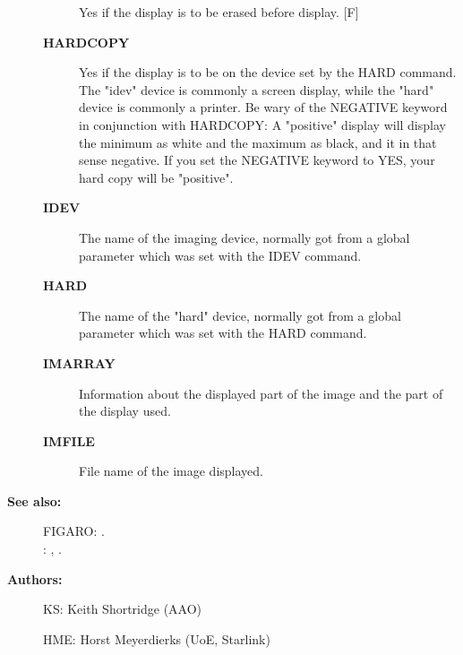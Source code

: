 \begin{description}
\begin{description}
 Yes if the display is to be erased before display. [F]
\item [{\bf HARDCOPY}]
 Yes if the display is to be on the device set by the HARD
 command. The "idev" device is commonly a screen display, while
 the "hard" device is commonly a printer.   Be wary of the
 NEGATIVE keyword in conjunction with HARDCOPY:  A "positive"
 display will display the minimum as white and the maximum as
 black, and it in that sense negative. If you set the NEGATIVE
 keyword to YES, your hard copy will be "positive".
\item [{\bf IDEV}]
 The name of the imaging device, normally got from a global
 parameter which was set with the IDEV command.
\item [{\bf HARD}]
 The name of the "hard" device, normally got from a global
 parameter which was set with the HARD command.
\item [{\bf IMARRAY}]
 Information about the displayed part of the image and the part
 of the display used.
\item [{\bf IMFILE}]
 File name of the image displayed.
\end{description}

\item [{\bf See also:}]
FIGARO: .\\
: , .\\

\item [{\bf Authors:}]
 KS: Keith Shortridge (AAO)

 HME: Horst Meyerdierks (UoE, Starlink)
\end{description}
